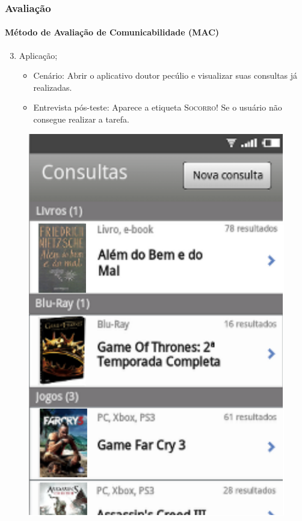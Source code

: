 \documentclass[14pt,beamer]{beamer}
\begin{document}
\begin{frame}
	\frametitle{Avaliação}
	\framesubtitle{Método de Avaliação de Comunicabilidade (MAC)}

	\begin{enumerate} \setcounter{enumi}{2}
        \item Aplicação;
            \begin{itemize}
                \item Cenário: Abrir o aplicativo doutor pecúlio e visualizar suas consultas já
                        realizadas.
                \item Entrevista pós-teste: Aparece a etiqueta \textsc{Socorro!} Se o usuário não consegue realizar a
                        tarefa.
            \end{itemize}
	\end{enumerate}
    
    \begin{figure}
        \centering
        \includegraphics[scale=.4]{tela/TelaHistorico}
    \end{figure}
\end{frame}
\end{document}
